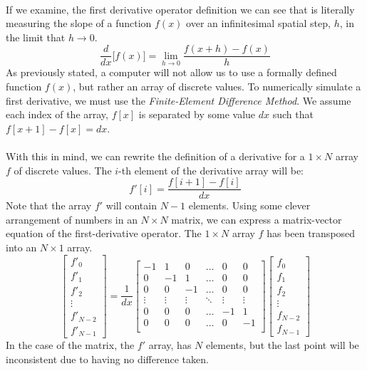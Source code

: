 \documentclass[12pt,letterpaper]{book}
\begin{document}
\paragraph*{}If we examine, the first derivative operator definition we can see that is literally measuring the slope of a function $f(x)$ over an infinitesimal spatial step, $h$, in the limit that $h \rightarrow 0$.
\begin{equation}
\frac{d}{dx}\Big[ f(x) \Big] = \lim_{h \rightarrow 0} \frac{f(x + h) - f(x)}{h}
\end{equation}
As previously stated, a computer will not allow us to use a formally defined function $f(x)$, but rather an array of discrete values. To numerically simulate a first derivative, we must use the \textit{Finite-Element Difference Method}. We assume each index of the array, $f[x]$ is separated by some value $dx$ such that $f[x+1] - f[x] = dx$. 

\paragraph*{}With this in mind, we can rewrite the definition of a derivative for a $1 \times N$ array $f$ of discrete values. The $i$-th element of the derivative array will be:
\begin{equation}
f'[i] = \frac{f[i+1] - f[i]}{dx}
\end{equation}
Note that the array $f'$ will contain $N-1$ elements. Using some clever arrangement of numbers in an $N \times N$ matrix, we can express a matrix-vector equation of the first-derivative operator. The $1 \times N$ array $f$ has been transposed into an $N \times 1$ array.
\begin{equation}
\label{1st-Deriv-Mat-Vec}
\begin{bmatrix}
f'_0 \\ f'_1 \\ f'_2 \\ \vdots \\ f'_{N-2} \\ f'_{N-1}
\end{bmatrix} = \frac{1}{dx}
\begin{bmatrix}
-1 & 1 & 0 & \hdots & 0 & 0 \\
0 & -1 & 1 & \hdots & 0 & 0 \\
0 & 0 & -1 & \hdots & 0 & 0 \\
\vdots & \vdots & \vdots & \ddots & \vdots & \vdots \\
0 & 0 & 0 & \hdots & -1 & 1 \\
0 & 0 & 0 & \hdots & 0 & -1 \\
\end{bmatrix}
\begin{bmatrix}
f_0 \\ f_1 \\ f_2 \\ \vdots \\ f_{N-2} \\ f_{N-1}
\end{bmatrix}
\end{equation}
In the case of the matrix, the $f'$ array, has $N$ elements, but the last point will be inconsistent due to having no difference taken.
\end{document}
